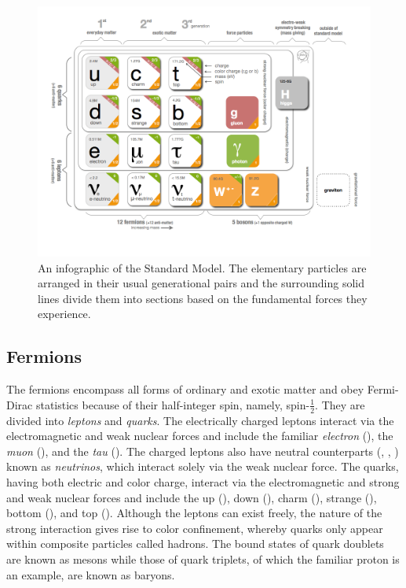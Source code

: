 \begin{figure}[htbp]
  \centering
    \includegraphics[width=6in]{images/SMinfographic_image}
    \caption[Standard Model Infographic]{An infographic of the Standard Model. The elementary particles are arranged in their usual generational pairs and the surrounding solid lines divide them into sections based on the fundamental forces they experience.\cite{Purcell:1473657}}
    \label{fig:SM}
\end{figure}

\subsection{Fermions}

The fermions encompass all forms of ordinary and exotic matter and obey Fermi-Dirac statistics because of their half-integer spin, namely, spin-\ensuremath{\frac{1}{2}}. They are divided into \textit{leptons} and \textit{quarks}. The electrically charged leptons interact via the electromagnetic and weak nuclear forces and include the familiar \textit{electron} (\lepe), the \textit{muon} (\lepm), and the \textit{tau} (\lept). The charged leptons also have neutral counterparts (\lepne, \lepnm, \lepnt) known as \textit{neutrinos}, which interact solely via the weak nuclear force. The quarks, having both electric and color charge, interact via the electromagnetic and strong and weak nuclear forces and include the up (\qrku), down (\qrkd), charm (\qrkc), strange (\qrks), bottom (\qrkb), and top (\qrkt). Although the leptons can exist freely, the nature of the strong interaction gives rise to color confinement, whereby quarks only appear within composite particles called hadrons. The bound states of quark doublets are known as mesons while those of quark triplets, of which the familiar proton is an example, are known as baryons.

